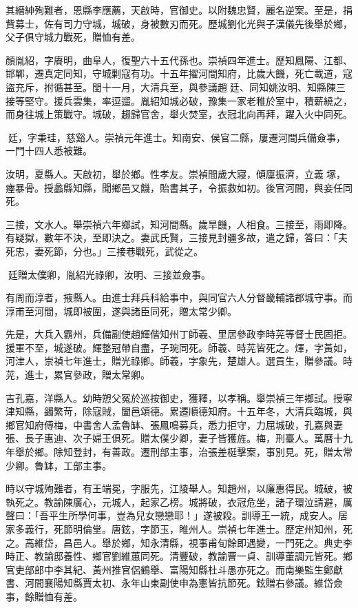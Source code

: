 \begin{pinyinscope}
其縉紳殉難者，恩縣李應薦，天啟時，官御史。以附魏忠賢，麗名逆案。至是，捐貲募士，佐有司力守城，城破，身被數刃而死。歷城劉化光與子漢儀先後舉於鄉，父子俱守城力戰死，贈恤有差。

顏胤紹，字賡明，曲阜人，復聖六十五代孫也。崇禎四年進士。歷知鳳陽、江都、邯鄲，遷真定同知，守城剿寇有功。十五年擢河間知府，比歲大饑，死亡載道，寇盜充斥，拊循甚至。閏十一月，大清兵至，與參議趙廷、同知姚汝明、知縣陳三接等堅守。援兵雲集，率逗遛。胤紹知城必破，豫集一家老稚於室中，積薪繞之，而身往城上策戰守。城破，趨歸官舍，舉火焚室，衣冠北向再拜，躍入火中同死。

廷，字秉珪，慈谿人。崇禎元年進士。知南安、侯官二縣，屢遷河間兵備僉事，一門十四人悉被難。

汝明，夏縣人。天啟初，舉於鄉。性孝友。崇禎間歲大寢，傾廩振濟，立義塚，瘞暴骨。授蠡縣知縣，聞鄉邑又饑，貽書其子，令振救如初。後官河間，與妾任同死。

三接，文水人。舉崇禎六年鄉試，知河間縣。歲旱饑，人相食。三接至，雨即降。有疑獄，數年不決，至即決之。妻武氏賢，三接見封疆多故，遣之歸，答曰：「夫死忠，妻死節，分也。」三接巷戰死，武從之。

廷贈太僕卿，胤紹光祿卿，汝明、三接並僉事。

有周而淳者，掖縣人。由進士拜兵科給事中，與同官六人分督畿輔諸郡城守事。而淳甫至河間，城即被圍，遂與諸臣同死，贈太常少卿。

先是，大兵入霸州，兵備副使趙輝偕知州丁師羲、里居參政李時茪等督士民固拒。援軍不至，城遂破。輝整冠帶自盡，子琬同死。師羲、時茪皆死之。煇，字黃如，河津人，崇禎七年進士，贈光祿卿。師羲，字象先，楚雄人。選貢生，贈參議。時茪，進士，累官參政，贈太常卿。

吉孔嘉，洋縣人。幼時愬父冤於巡按御史，獲釋，以孝稱。舉崇禎三年鄉試。授寧津知縣，蠲繁苛，除寇賊，闔邑頌德。累遷順德知府。十五年冬，大清兵臨城，與鄉官知府傅梅，中書舍人孟魯缽、張鳳鳴募兵，悉力拒守，力屈城破，孔嘉與妻張、長子惠迪、次子婦王俱死。贈太僕少卿，妻子皆獲旌。梅，刑臺人。萬曆十九年舉於鄉。除知登封，有善政。遷刑部主事，治張差梃擊案，事別見。死，贈太常少卿。魯缽，工部主事。

時以守城殉難者，有王端冕，字服先，江陵舉人。知趙州，以廉惠得民。城破，被執死之。教諭陳廣心，元城人，起家乙榜。城將破，衣冠危坐，諸子環泣請避，厲聲曰：「吾平生所學何事，豈為兒女戀戀耶！」遂被殺。訓導王一統，成安人。居家多義行，死節明倫堂。唐鉉，字節玉，睢州人。崇禎七年進士。歷定州知州，死之。高維岱，昌邑人。舉於鄉，知永清縣，視事甫旬餘即遇變，一門死之。典史李時正、教諭邸養性、鄉官劉維蕙同死。清豐破，教諭曹一貞、訓導董調元皆死。鄉官吏部郎中李其紀、黃州推官侶鶴舉、富陽知縣杜斗愚亦死之。而南樂監生鄭獻書、河間襄陽知縣賈太初、永年山東副使申為憲皆抗節死。鉉贈右參議。維岱僉事，餘贈恤有差。


\end{pinyinscope}
